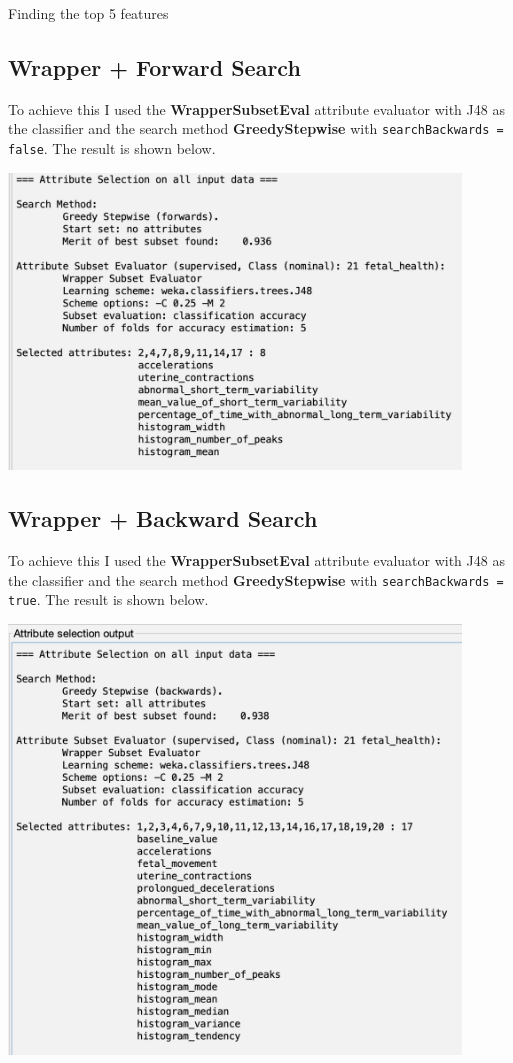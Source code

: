 \documentclass[12pt]{article}
\begin{document}
\begin{section}{Finding the top 5 features}
 \subsection{Wrapper + Forward Search}
 To achieve this I used the \textbf{WrapperSubsetEval} attribute evaluator with J48 as the classifier and
 the search method \textbf{GreedyStepwise} with \texttt{searchBackwards = false}. The result is shown below.

 \begin{center}
     \includegraphics[width=12cm]{images/5_2_wrapper_forwards.png}
 \end{center}

 \subsection{Wrapper + Backward Search}
 To achieve this I used the \textbf{WrapperSubsetEval} attribute evaluator with J48 as the classifier and
 the search method \textbf{GreedyStepwise} with \texttt{searchBackwards = true}. The result is shown below.

 \begin{center}
     \includegraphics[width=12cm]{images/5_2_wrapper_backwards.png}
 \end{center}


\end{section}
\end{document}
